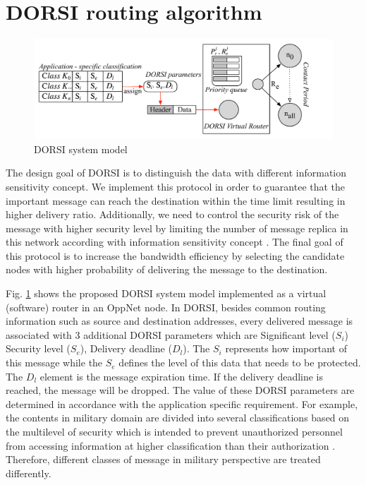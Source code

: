 \section{DORSI routing algorithm}
\label{DORSI:DORSI routing algorithm}
\begin{figure}[!t]
\centering
\includegraphics[width=5.5in]{Figures/DORSIsystemModel.pdf}
\caption{DORSI system model}
\label{DORSI system model}
\end{figure}

The design goal of DORSI is to distinguish the data with different information sensitivity concept. 
We implement this protocol in order to guarantee that the important message can reach the destination within the time limit resulting in higher delivery ratio. 
Additionally, we need to control the security risk of the message with higher security level by limiting the number of message replica in this network according with information sensitivity concept \cite{Kotrappa2010,marking2010}. 
The final goal of this protocol is to increase the bandwidth efficiency by selecting the candidate nodes with higher probability of delivering the message to the destination.

Fig. \ref{DORSI system model} shows the proposed DORSI system model implemented as a virtual (software) router in an OppNet node. 
In DORSI, besides common routing information such as source and destination addresses, every delivered message is associated with 3 additional DORSI parameters which are Significant level ($S_i$) Security level ($S_e$), Delivery deadline ($D_l$). 
The $S_i$ represents how important of this message while the $S_e$ defines the level of this data that needs to be protected. 
The $D_l$ element is the message expiration time. 
If the delivery deadline is reached, the message will be dropped. 
The value of these DORSI parameters are determined in accordance with the application specific requirement. 
For example, the contents in military domain are divided into several classifications based on the multilevel of security which is intended to prevent unauthorized personnel from accessing information at higher classification than their authorization \cite{Winjum2008}. 
Therefore, different classes of message in military perspective are treated differently.



